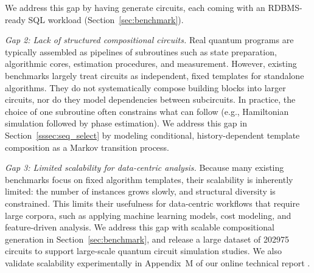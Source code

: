We address this gap by having \sys generate  circuits, each coming with an RDBMS-ready SQL workload (Section~\ref{sec:benchmark}). 

\emph{Gap 2: Lack of structured compositional circuits.}
Real quantum programs 
are typically
assembled as pipelines of subroutines such as state preparation, algorithmic cores, estimation procedures, and
measurement. 
However, existing benchmarks largely treat circuits as independent, fixed templates for standalone algorithms.
They do not systematically compose building blocks into larger circuits, nor do they model dependencies between
subcircuits. In practice, the choice of one subroutine often constrains what can follow (e.g., Hamiltonian simulation
followed by phase estimation).
We address this gap in Section~\ref{sssec:seq_select} by modeling conditional, history-dependent template
composition as a Markov transition process.

\emph{Gap 3: Limited scalability for data-centric analysis.}
Because many existing benchmarks focus on fixed algorithm templates, their scalability is inherently limited:
the number of instances grows slowly, and structural diversity is constrained. This limits their usefulness for
data-centric workflows that require large corpora, such as applying machine learning models, cost modeling, and feature-driven analysis. 
We address this gap with scalable compositional generation in Section~\ref{sec:benchmark}, and release a large dataset of \num{202975} circuits to support large-scale quantum circuit simulation studies. We also validate scalability experimentally in Appendix~M of our online technical report \cite{inferqtech}.  
 

